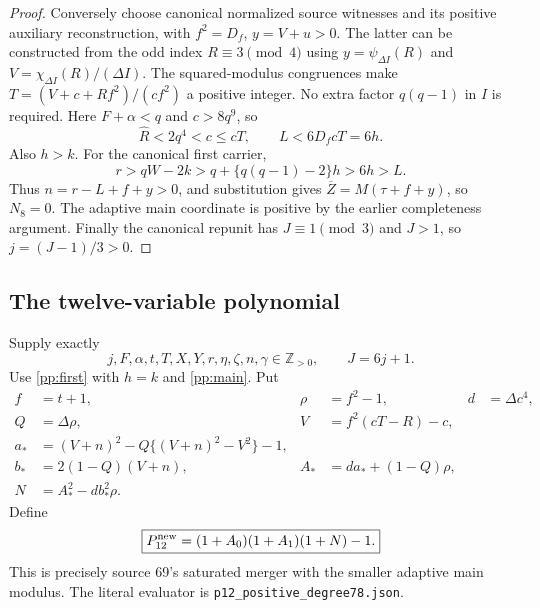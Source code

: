 \begin{proof}
Conversely choose canonical normalized source witnesses and its positive
auxiliary reconstruction, with $f^2=D_f$, $y=V+u>0$. The latter can be
constructed from the odd index $R\equiv3\pmod4$ using
$y=\psi_{\Delta I}(R)$ and $V=\chi_{\Delta I}(R)/(\Delta I)$.
The squared-modulus congruences make
$T=(V+c+Rf^2)/(cf^2)$ a positive integer. No extra factor $q(q-1)$ in
$I$ is required. Here $F+\alpha<q$ and $c>8q^9$, so
\[
 \widehat R<2q^4<c\le cT,\qquad L<6D_fcT=6h.
\]
Also $h>k$. For the canonical first carrier,
\[
 r>qW-2k>q+\{q(q-1)-2\}h>6h>L.
\]
Thus $n=r-L+f+y>0$, and substitution gives
$\overline Z=M(\tau+f+y)$, so $N_8=0$. The adaptive main coordinate is
positive by the earlier completeness argument. Finally the canonical
repunit has $J\equiv1\pmod3$ and $J>1$, so $j=(J-1)/3>0$.
\end{proof}

\subsection{The twelve-variable polynomial}

Supply exactly
\[
 j,F,\alpha,t,T,X,Y,r,\eta,\zeta,n,\gamma\in\mathbb Z_{>0},
 \qquad J=6j+1.
\]
Use \eqref{pp:first} with $h=k$ and \eqref{pp:main}. Put
\begin{align}
 f&=t+1,&\rho&=f^2-1,&d&=\Delta c^4,\nonumber\\
 Q&=\Delta\rho,&V&=f^2(cT-R)-c,\nonumber\\
 a_*&=(V+n)^2-Q\{(V+n)^2-V^2\}-1,\nonumber\\
 b_*&=2(1-Q)(V+n),&A_*&=da_*+(1-Q)\rho,\nonumber\\
 N&=A_*^2-db_*^2\rho.                          \label{pp:12norm}
\end{align}
Define
\begin{equation}
 \boxed{P_{12}^{\rm new}=(1+A_0)(1+A_1)(1+N)-1.}\label{pp:12poly}
\end{equation}
This is precisely source 69's saturated merger with the smaller adaptive
main modulus. The literal evaluator is
\texttt{p12\_positive\_degree78.json}.

